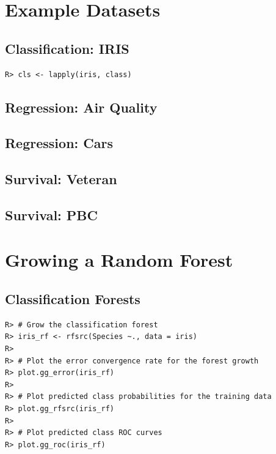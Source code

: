 \documentclass[nojss]{jss}\usepackage[]{graphicx}\usepackage[]{color}
\makeatletter
\newenvironment{kframe}{%
 \def\at@end@of@kframe{}%
 \ifinner\ifhmode%
  \def\at@end@of@kframe{\end{minipage}}%
  \begin{minipage}{\columnwidth}%
 \fi\fi%
 \def\FrameCommand##1{\hskip\@totalleftmargin \hskip-\fboxsep
 \colorbox{shadecolor}{##1}\hskip-\fboxsep
     \hskip-\linewidth \hskip-\@totalleftmargin \hskip\columnwidth}%
 \MakeFramed {\advance\hsize-\width
   \@totalleftmargin\z@ \linewidth\hsize
   \@setminipage}}%
 {\par\unskip\endMakeFramed%
 \at@end@of@kframe}
\newenvironment{knitrout}{}{} %
\makeatother
\begin{document}
\section{Example Datasets}
\subsection{Classification: IRIS}
\begin{knitrout}\footnotesize
{}\color{fgcolor}\begin{kframe}
\begin{verbatim}
R> cls <- lapply(iris, class)
\end{verbatim}
\end{kframe}
\end{knitrout}
\subsection{Regression: Air Quality}

\subsection{Regression: Cars}

\subsection{Survival: Veteran}

\subsection{Survival: PBC}

\section{Growing a Random Forest}

\subsection{Classification Forests}
\begin{knitrout}\footnotesize
{}\color{fgcolor}\begin{kframe}
\begin{verbatim}
R> # Grow the classification forest
R> iris_rf <- rfsrc(Species ~., data = iris)
R> 
R> # Plot the error convergence rate for the forest growth
R> plot.gg_error(iris_rf)
R> 
R> # Plot predicted class probabilities for the training data
R> plot.gg_rfsrc(iris_rf)
R> 
R> # Plot predicted class ROC curves
R> plot.gg_roc(iris_rf)
\end{verbatim}
\end{kframe}
\end{knitrout}
\end{document}

